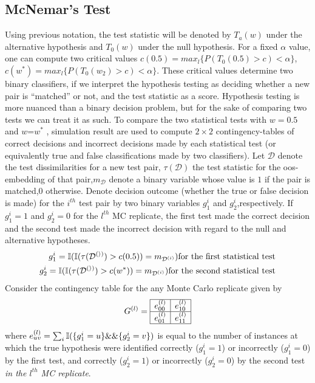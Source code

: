 \documentclass[12pt,oneside,final]{thesis}\usepackage[]{graphicx}\usepackage[]{color}
\begin{document}
\subsection{McNemar's Test\label{subsec:McNemarstest}}
Using previous notation,  the test statistic will be denoted by $T_a(w)$ under the alternative hypothesis and $T_0(w)$ under the null hypothesis.
For a fixed $\alpha$ value, one can compute two critical values $c(0.5)=max_l \{  P(T_0(0.5)>c)<\alpha\}$,  $c(w^*)=max_l \{  P(T_0(w_2)>c)<\alpha\}$. These critical values determine two binary classifiers, if we interpret the hypothesis testing as deciding whether a new pair is ``matched'' or not, and the test statistic as a score. Hypothesis testing is more nuanced than a binary decision problem, but for the sake of comparing two tests we can treat it as such.
To compare the  two statistical tests with  $w=0.5$ and $w$=$w^*$ , simulation result are used to compute $2\times 2$ contingency-tables of correct decisions and incorrect decisions made by each statistical test (or equivalently true and false classifications made by two classifiers). Let $\mathcal{D}$ denote the test dissimilarities for a new test pair, $\tau(\mathcal{D})$ the test statistic for the oos-embedding of that pair,$m_{\mathcal{D}}$ denote a binary variable whose value is $1$ if the pair is matched,$0$ otherwise. Denote decision outcome (whether the true or false decision is made) for the $i^{th}$ test pair by two binary variables $g_1^{i}$ and $g_2^{i}$,respectively.  If $g_1^{i} =1$ and $g_2^{i}=0$  for the $l^{th}$ MC replicate,  the first test made the correct decision and the second test made the incorrect decision with regard to the null and alternative hypotheses. 
\begin{align*}
g_1^{i}=\mathbb{I}(\mathbb{I}(\tau(\mathcal{D^{(i)}})>c(0.5))=m_{\mathcal{D}^{(i)}}) \textrm{for the first statistical test} \\
g_2^{i}=\mathbb{I}(\mathbb{I}(\tau(\mathcal{D^{(i)}})>c(w^*))=m_{\mathcal{D}^{(i)}}) \textrm{for the second statistical test}
\end{align*}
Consider the contingency table for the any Monte Carlo replicate given by $$G^{(l)}= \begin{array}{|c|c|}
      \hline
       e_{00}^{(l)} & e_{10}^{(l)}\\
      \hline
       e_{01}^{(l)} & e_{11}^{(l)}\\
      \hline
      \end{array}      $$  where  $e_{uv}^{(l)}=\sum_{i}{\mathbb{I}(\{g_1^{i}=u\} \&\& \{g_2^{i}=v\})}$ is equal to the number of instances at which the true hypothesis were identified  correctly ($g_1^{i}=1$) or incorrectly ($g_1^{i}=0$) by the first test, and correctly ($g_2^{i}=1$) or incorrectly ($g_2^{i}=0$) by the second test \emph{ in the $l^{th}$  MC replicate}.
\end{document}

